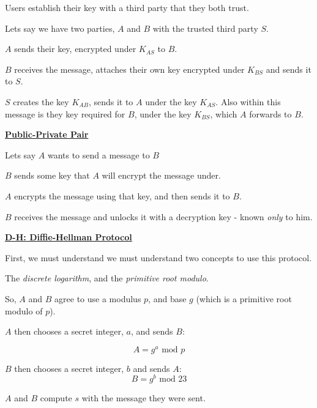 \documentclass{article}
\begin{document}
Users establish their key with a third party that they both trust.

Lets say we have two parties, $A$ and $B$ with the trusted third party $S$.

$A$ sends their key, encrypted under $K_{AS}$ to $B$.

$B$ receives the message, attaches their own key encrypted under $K_{BS}$ and sends it to $S$.

$S$ creates the key $K_{AB}$, sends it to $A$ under the key $K_{AS}$. Also within this message is they key required for $B$, under the key $K_{BS}$, which $A$ forwards to $B$.

\textbf{\underline{Public-Private Pair}}

Lets say $A$ wants to send a message to $B$

$B$ sends some key that $A$ will encrypt the message under.

$A$ encrypts the message using that key, and then sends it to $B$.

$B$ receives the message and unlocks it with a decryption key - known \textit{only} to him.

\textbf{\underline{D-H: Diffie-Hellman Protocol}}

First, we must understand we must understand two concepts to use this protocol.

The \textit{discrete logarithm}, and the \textit{primitive root modulo}.



So, $A$ and $B$ agree to use a modulus $p$, and base $g$ (which is a primitive root modulo of $p$).

$A$ then chooses a secret integer, $a$, and sends $B$:

\[ A = g^a \text{ mod } p\]

$B$ then chooses a secret integer, $b$ and sends $A$:
\[ B = g^b \text{ mod } 23\]

$A$ and $B$ compute $s$ with the message they were sent.
\end{document}
